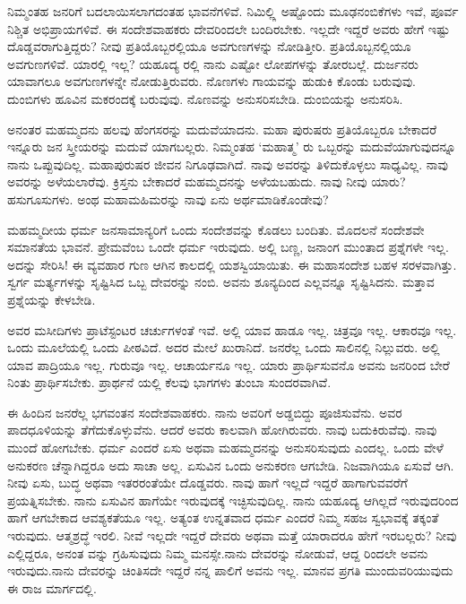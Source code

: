 ನಿಮ್ಮಂತಹ ಜನರಿಗೆ ಬದಲಾಯಿಸಲಾಗದಂತಹ ಭಾವನೆಗಳಿವೆ. ನಿಮಿಲ್ಲ್ಲಿ ಅಷ್ಟೊಂದು ಮೂಢನಂಬಿಕೆಗಳು ಇವೆ, ಪೂರ್ವ ನಿಶ್ಚಿತ ಅಭಿಪ್ರಾಯಗಳಿವೆ. ಈ ಸಂದೇಶವಾಹಕರು ದೇವರಿಂದಲೇ ಬಂದಿರಬೇಕು. ಇಲ್ಲದೇ ಇದ್ದರೆ ಅವರು ಹೇಗೆ ಇಷ್ಟು ದೊಡ್ಡವರಾಗುತ್ತಿದ್ದರು? ನೀವು ಪ್ರತಿಯೊಬ್ಬರಲ್ಲಿಯೂ ಅವಗುಣಗಳನ್ನು ನೋಡಿತ್ತೀರಿ. ಪ್ರತಿಯೊಬ್ಬನಲ್ಲಿಯೂ ಅವಗುಣಗಳಿವೆ. ಯಾರಲ್ಲಿ ಇಲ್ಲ? ಯಹೂದ್ಯ ರಲ್ಲಿ ನಾನು ಎಷ್ಟೋ ಲೋಪಗಳನ್ನು ತೋರಬಲ್ಲೆ. ದುರ್ಜನರು ಯಾವಾಗಲೂ ಅವಗುಣಗಳನ್ನೇ ನೋಡುತ್ತಿರುವರು. ನೊಣಗಳು ಗಾಯವನ್ನು ಹುಡುಕಿ ಕೊಂಡು ಬರುವುವು. ದುಂಬಿಗಳು ಹೂವಿನ ಮಕರಂದಕ್ಕೆ ಬರುವುವು. ನೊಣವನ್ನು ಅನುಸರಿಸಬೇಡಿ. ದುಂಬಿಯನ್ನು ಅನುಸರಿಸಿ.

ಅನಂತರ ಮಹಮ್ಮದನು ಹಲವು ಹೆಂಗಸರನ್ನು ಮದುವೆಯಾದನು. ಮಹಾ ಪುರುಷರು ಪ್ರತಿಯೊಬ್ಬರೂ ಬೇಕಾದರೆ ಇನ್ನೂರು ಜನ ಸ್ತ್ರೀಯರನ್ನು ಮದುವೆ ಯಾಗಬಲ್ಲರು. ನಿಮ್ಮಂತಹ ‘ಮಹಾತ್ಮ’ ರು ಒಬ್ಬರನ್ನು ಮದುವೆಯಾಗುವುದನ್ನೂ ನಾನು ಒಪ್ಪುವುದಿಲ್ಲ. ಮಹಾಪುರುಷರ ಜೀವನ ನಿಗೂಢವಾಗಿದೆ. ನಾವು ಅವರನ್ನು ತಿಳಿದುಕೊಳ್ಳಲು ಸಾಧ್ಯವಿಲ್ಲ. ನಾವು ಅವರನ್ನು ಅಳೆಯಲಾರೆವು. ಕ್ರಿಸ್ತನು ಬೇಕಾದರೆ ಮಹಮ್ಮದನನ್ನು ಅಳೆಯಬಹುದು. ನಾವು ನೀವು ಯಾರು? ಹಸುಗೂಸುಗಳು. ಅಂಥ ಮಹಾಮಹಿಮರನ್ನು ನಾವು ಏನು ಅರ್ಥಮಾಡಿಕೊಂಡೇವು?

ಮಹಮ್ಮದೀಯ ಧರ್ಮ ಜನಸಾಮಾನ್ಯರಿಗೆ ಒಂದು ಸಂದೇಶವನ್ನು ಕೊಡಲು ಬಂದಿತು. ಮೊದಲನೆ ಸಂದೇಶವೇ ಸಮಾನತೆಯ ಭಾವನೆ. ಪ್ರೇಮವೆಂಬ ಒಂದೇ ಧರ್ಮ ಇರುವುದು. ಅಲ್ಲಿ ಬಣ್ಣ, ಜನಾಂಗ ಮುಂತಾದ ಪ್ರಶ್ನೆಗಳೇ ಇಲ್ಲ. ಅದನ್ನು ಸೇರಿಸಿ! ಈ ವ್ಯವಹಾರ ಗುಣ ಆಗಿನ ಕಾಲದಲ್ಲಿ ಯಶಸ್ವಿಯಾಯಿತು. ಈ ಮಹಾಸಂದೇಶ ಬಹಳ ಸರಳವಾಗಿತ್ತು. ಸ್ವರ್ಗ ಮರ್ತ್ಯಗಳನ್ನು ಸೃಷ್ಟಿಸಿದ ಒಬ್ಬ ದೇವರನ್ನು ನಂಬಿ. ಅವನು ಶೂನ್ಯದಿಂದ ಎಲ್ಲವನ್ನೂ ಸೃಷ್ಟಿಸಿದನು. ಮತ್ತಾವ ಪ್ರಶ್ನೆಯನ್ನು ಕೇಳಬೇಡಿ.

ಅವರ ಮಸೀದಿಗಳು ಪ್ರಾಟೆಸ್ಟಂಟರ ಚರ್ಚುಗಳಂತೆ ಇವೆ. ಅಲ್ಲಿ ಯಾವ ಹಾಡೂ ಇಲ್ಲ. ಚಿತ್ರವೂ ಇಲ್ಲ. ಆಕಾರವೂ ಇಲ್ಲ. ಒಂದು ಮೂಲೆಯಲ್ಲಿ ಒಂದು ಪೀಠವಿದೆ. ಅದರ ಮೇಲೆ ಖುರಾನಿದೆ. ಜನರೆಲ್ಲ ಒಂದು ಸಾಲಿನಲ್ಲಿ ನಿಲ್ಲುವರು. ಅಲ್ಲಿ ಯಾವ ಪಾದ್ರಿಯೂ ಇಲ್ಲ. ಗುರುವೂ ಇಲ್ಲ. ಆಚಾರ್ಯನೂ ಇಲ್ಲ. ಯಾರು ಪ್ರಾರ್ಥಿಸುವನೊ ಅವನು ಜನರಿಂದ ಬೇರೆ ನಿಂತು ಪ್ರಾರ್ಥಿಸಬೇಕು. ಪ್ರಾರ್ಥನೆ ಯಲ್ಲಿ ಕೆಲವು ಭಾಗಗಳು ತುಂಬಾ ಸುಂದರವಾಗಿವೆ.

ಈ ಹಿಂದಿನ ಜನರೆಲ್ಲ ಭಗವಂತನ ಸಂದೇಶವಾಹಕರು. ನಾನು ಅವರಿಗೆ ಅಡ್ಡಬಿದ್ದು ಪೂಜಿಸುವೆನು. ಅವರ ಪಾದಧೂಳಿಯನ್ನು ತೆಗೆದುಕೊಳ್ಳುವೆನು. ಆದರೆ ಅವರು ಕಾಲವಾಗಿ ಹೋಗಿರುವರು. ನಾವು ಬದುಕಿರುವೆವು. ನಾವು ಮುಂದೆ ಹೋಗಬೇಕು. ಧರ್ಮ ಎಂದರೆ ಏಸು ಅಥವಾ ಮಹಮ್ಮದನನ್ನು ಅನುಸರಿಸುವುದು ಎಂದಲ್ಲ. ಒಂದು ವೇಳೆ ಅನುಕರಣ ಚೆನ್ನಾಗಿದ್ದರೂ ಅದು ಸಾಚಾ ಅಲ್ಲ. ಏಸುವಿನ ಒಂದು ಅನುಕರಣ ಆಗಬೇಡಿ. ನಿಜವಾಗಿಯೂ ಏಸುವೆ ಆಗಿ. ನೀವು ಏಸು, ಬುದ್ಧ ಅಥವಾ ಇತರರಂತೆಯೇ ದೊಡ್ಡವರು. ನಾವು ಹಾಗೆ ಇಲ್ಲದೆ ಇದ್ದರೆ ಹಾಗಾಗುವವರೆಗೆ ಪ್ರಯತ್ನಿಸಬೇಕು. ನಾನು ಏಸುವಿನ ಹಾಗೆಯೇ ಇರುವುದಕ್ಕೆ ಇಚ್ಛಿಸುವುದಿಲ್ಲ. ನಾನು ಯಹೂದ್ಯ ಆಗಿಲ್ಲದೆ ಇರುವುದರಿಂದ ಹಾಗೆ ಆಗಬೇಕಾದ ಆವಶ್ಯಕತೆಯೂ ಇಲ್ಲ. ಅತ್ಯಂತ ಉನ್ನತವಾದ ಧರ್ಮ ಎಂದರೆ ನಿಮ್ಮ ಸಹಜ ಸ್ವಭಾವಕ್ಕೆ ತಕ್ಕಂತೆ ಇರುವುದು. ಆತ್ಮಶ್ರದ್ಧೆ ಇರಲಿ. ನೀವೆ ಇಲ್ಲದೇ ಇದ್ದರೆ ದೇವರು ಅಥವಾ ಮತ್ತೆ ಯಾರಾದರೂ ಹೇಗೆ ಇರಬಲ್ಲರು? ನೀವು ಎಲ್ಲಿದ್ದರೂ, ಅನಂತ ವನ್ನು ಗ್ರಹಿಸುವುದು ನಿಮ್ಮ ಮನಸ್ಸೇ.ನಾನು ದೇವರನ್ನು ನೋಡುವೆ, ಆದ್ದ ರಿಂದಲೇ ಅವನು ಇರುವುದು.ನಾನು ದೇವರನ್ನು ಚಿಂತಿಸದೇ ಇದ್ದರೆ ನನ್ನ ಪಾಲಿಗೆ ಅವನು ಇಲ್ಲ. ಮಾನವ ಪ್ರಗತಿ ಮುಂದುವರಿಯುವುದು ಈ ರಾಜ ಮಾರ್ಗದಲ್ಲಿ.

